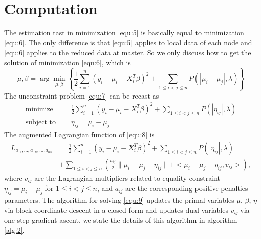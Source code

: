 \documentclass[review]{elsarticle}
\begin{document}
\section{Computation}\label{sec:3}
The estimation tast in minimization \ref{equ:5} is basically equal to minimization \ref{equ:6}. The only difference is that \ref{equ:5} applies to local data of each node and \ref{equ:6} applies to the reduced data at master. So we only discuss how to get the solution of minimization \ref{equ:6}, which is
\begin{equation}
\label{equ:7}
\mu, \beta = \arg\min_{\mu,\beta}\left\{\frac{1}{2}\sum_{i=1}^n(y_i-\mu_i-X_i^T\beta)^2+\sum_{1\leq i<j\leq n}P(|\mu_i-\mu_j|,\lambda)\right\}
\end{equation}
The unconstraint problem \ref{equ:7} can be recast as
\begin{equation}
\label{equ:8}
\begin{array}{cc}
\mbox{minimize~~~~} & \frac{1}{2}\sum_{i=1}^n(y_i-\mu_i-X_i^T\beta)^2+\sum_{1\leq i<j\leq n}P(|\eta_{ij}|,\lambda)\\
\mbox{subject to~~~~} & \eta_{ij}=\mu_i-\mu_j
\end{array}
\end{equation}
The augmented Lagrangian function \cite{boyd2011distributed} of \ref{equ:8} is
\begin{equation}
\label{equ:9}
\begin{aligned}
L_{a_{11},...,a_{1n},...,a_{nn}}&=\frac{1}{2}\sum_{i=1}^n(y_i-\mu_i-X_i^T\beta)^2+\sum_{1\leq i<j\leq n}P(|\eta_{ij}|,\lambda)\\
&+\sum_{1\leq i<j\leq n}(\frac{a_{ij}}{2}\lVert \mu_i-\mu_j-\eta_{ij}\rVert+<\mu_i-\mu_j-\eta_{ij}, v_{ij}>),
\end{aligned}
\end{equation}
where $v_{ij}$ are the Lagrangian multipliers related to equality constraint $\eta_{ij}=\mu_i-\mu_j$ for $1\leq i<j\leq n$, and $a_{ij}$ are the corresponding positive penalties parameters. The algorithm for solving \ref{equ:9} updates the primal variables $\mu$, $\beta$, $\eta$ via block coordinate descent in a closed form and updates dual variables $v_{ij}$ via one step gradient ascent. we state the details of this algorithm in algorithm \ref{alg:2}.
\end{document}
